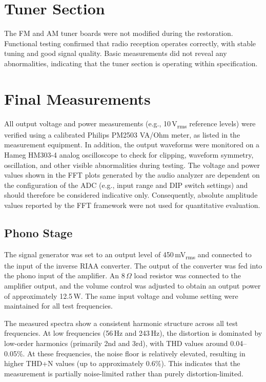 \documentclass[]{article}
\begin{document}
\section{Tuner Section}

The FM and AM tuner boards were not modified during the restoration. Functional testing confirmed that radio reception operates correctly, with stable tuning and good signal quality. Basic measurements did not reveal any abnormalities, indicating that the tuner section is operating within specification.

\section{Final Measurements}

All output voltage and power measurements (e.g., 10\,V\textsubscript{rms} reference levels) were verified using a calibrated Philips PM2503 VA/Ohm meter, as listed in the measurement equipment. In addition, the output waveforms were monitored on a Hameg HM303-4 analog oscilloscope to check for clipping, waveform symmetry, oscillation, and other visible abnormalities during testing. The voltage and power values shown in the FFT plots generated by the audio analyzer are dependent on the configuration of the ADC (e.g., input range and DIP switch settings) and should therefore be considered indicative only. Consequently, absolute amplitude values reported by the FFT framework were not used for quantitative evaluation.

\subsection{Phono Stage}

The signal generator was set to an output level of 450\,mV\textsubscript{rms} and connected to the input of the inverse RIAA converter. The output of the converter was fed into the phono input of the amplifier. An 8\,\(\Omega\) load resistor was connected to the amplifier output, and the volume control was adjusted to obtain an output power of approximately 12.5\,W. The same input voltage and volume setting were maintained for all test frequencies.

The measured spectra show a consistent harmonic structure across all test frequencies. At low frequencies (56\,Hz and 243\,Hz), the distortion is dominated by low-order harmonics (primarily 2nd and 3rd), with THD values around 0.04--0.05\%. At these frequencies, the noise floor is relatively elevated, resulting in higher THD+N values (up to approximately 0.6\%). This indicates that the measurement is partially noise-limited rather than purely distortion-limited.
\end{document}
